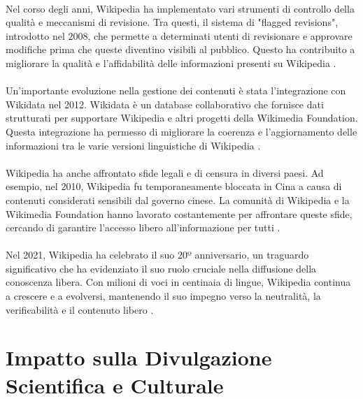 \documentclass[12pt,a4paper]{report}
\begin{document}
\paragraph*{}
Nel corso degli anni, Wikipedia ha implementato vari strumenti di controllo della qualità e meccanismi di revisione. Tra questi, il sistema di "flagged revisions", introdotto nel 2008, che permette a determinati utenti di revisionare e approvare modifiche prima che queste diventino visibili al pubblico. Questo ha contribuito a migliorare la qualità e l'affidabilità delle informazioni presenti su Wikipedia \cite{denning2005wikipedia}.

\paragraph*{}
Un'importante evoluzione nella gestione dei contenuti è stata l'integrazione con Wikidata nel 2012. Wikidata è un database collaborativo che fornisce dati strutturati per supportare Wikipedia e altri progetti della Wikimedia Foundation. Questa integrazione ha permesso di migliorare la coerenza e l'aggiornamento delle informazioni tra le varie versioni linguistiche di Wikipedia \cite{history_of_wikis}.

\paragraph*{}
Wikipedia ha anche affrontato sfide legali e di censura in diversi paesi. Ad esempio, nel 2010, Wikipedia fu temporaneamente bloccata in Cina a causa di contenuti considerati sensibili dal governo cinese. La comunità di Wikipedia e la Wikimedia Foundation hanno lavorato costantemente per affrontare queste sfide, cercando di garantire l'accesso libero all'informazione per tutti \cite{jemielniak2014wikipedia}.

\paragraph*{}
Nel 2021, Wikipedia ha celebrato il suo 20º anniversario, un traguardo significativo che ha evidenziato il suo ruolo cruciale nella diffusione della conoscenza libera. Con milioni di voci in centinaia di lingue, Wikipedia continua a crescere e a evolversi, mantenendo il suo impegno verso la neutralità, la verificabilità e il contenuto libero \cite{reagle2010good}.

\section{Impatto sulla Divulgazione Scientifica e Culturale}
\end{document}
